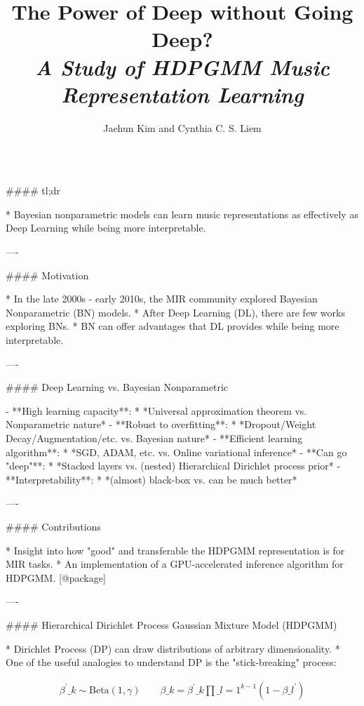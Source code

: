 \documentclass{beamer}
\author[j.h.kim@tudelft.nl]{Jaehun Kim and Cynthia C. S. Liem}
\title{\textbf{The Power of Deep without Going Deep?}\\ \textit{A Study of HDPGMM Music Representation Learning}}
\institute{Delft University of Technology}
\begin{document}
\begin{frame}[fragile]\centering



\begin{columns}[T]

\begin{column}{.46\textwidth}

\begin{markdown}

#### tl;dr

* Bayesian nonparametric models can learn music representations as effectively as Deep Learning while being more interpretable.


----


#### Motivation

* In the late 2000s - early 2010s, the MIR community explored Bayesian Nonparametric (BN) models.
* After Deep Learning (DL), there are few works exploring BNs.
* BN can offer advantages that DL provides while being more interpretable.

----

#### Deep Learning vs. Bayesian Nonparametric

- **High learning capacity**:
    * *Universal approximation theorem vs. Nonparametric nature*
- **Robust to overfitting**:
    * *Dropout/Weight Decay/Augmentation/etc. vs. Bayesian nature*
- **Efficient learning algorithm**:
    * *SGD, ADAM, etc. vs. Online variational inference*
- **Can go "deep"**:
    * *Stacked layers vs. (nested) Hierarchical Dirichlet process prior*
- **Interpretability**:
    * *(almost) black-box vs. can be much better*

----

#### Contributions

* Insight into how "good" and transferable the HDPGMM representation is for MIR tasks.
* An implementation of a GPU-accelerated inference algorithm for HDPGMM. [@package]

----

\bigskip
{\hrulefill}
\bigskip

#### Hierarchical Dirichlet Process Gaussian Mixture Model (HDPGMM)

* Dirichlet Process (DP) can draw distributions of arbitrary dimensionality.
* One of the useful analogies to understand DP is the "stick-breaking" process:

\begin{align}
    \beta^{\prime}\_{k} \sim \text{Beta}(1, \gamma) \qquad
    \beta\_{k} = \beta^{\prime}\_{k} \prod\_{l=1}^{k-1} (1 - \beta\_{l}^{\prime})
\end{align}



\end{markdown}
\end{column}
\end{columns}
\end{frame}
\end{document}

